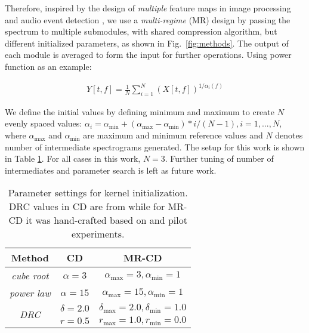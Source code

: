 \documentclass{article}
\begin{document}
Therefore, inspired by the design of \emph{multiple} feature maps in image processing \cite{image_processing} and audio event detection \cite{pcen_sed_2021}, we use a \emph{multi-regime} (MR) design by passing the spectrum to multiple submodules, with shared compression algorithm, but different initialized parameters, as shown in Fig.~\ref{fig:methods}. The output of each module is averaged to form the input for further operations. Using power function as an example:

\begin{align}
    Y[t,f] = \frac{1}{N}\sum_{i=1}^{N}(X[t,f])^{1/\alpha_{i}(f)}
\end{align}

We define the initial values by defining minimum and maximum to create $N$ evenly spaced values: $\alpha_{i}=\alpha_{\mathrm{min}} + (\alpha_{\mathrm{max}}-\alpha_\mathrm{min})*i/(N-1), i=1,...,N$, where $\alpha_{\mathrm{max}}$ and $\alpha_\mathrm{min}$ are maximum and minimum reference values and $N$ denotes number of intermediate spectrograms generated. The setup for this work is shown in Table \ref{tab:params}. For all cases in this work, $N=3$. Further tuning of number of intermediates and parameter search is left as future work.

\begin{table}[htbp]
    \centering
    \begin{tabular}{|c|c|c|}
        \hline
        Method & CD & MR-CD  \\ \hline
        \emph{cube root} \cite{rastaplp1990} & $\alpha=3$ & $\alpha_{\mathrm{max}}=3, \alpha_\mathrm{min}=1$ \\ \hline
        \emph{power law} \cite{mhec} & $\alpha=15$ & $\alpha_{\mathrm{max}}=15, \alpha_\mathrm{min}=1$ \\ \hline
        \multirow{2}{2em}{\emph{DRC}} & $\delta=2.0$ & $\delta_{\mathrm{max}}=2.0, \delta_\mathrm{min}=1.0$  \\
         & $r=0.5$ & $r_{\mathrm{max}}=1.0, r_\mathrm{min}=0.0$ \\ \hline
    \end{tabular}
    \caption{Parameter settings for kernel initialization. DRC values in CD are from \cite{pcen_2017} while for MR-CD it was hand-crafted based on \cite{pcen_2018} and pilot experiments.}
\label{tab:params}
\end{table}
\end{document}
